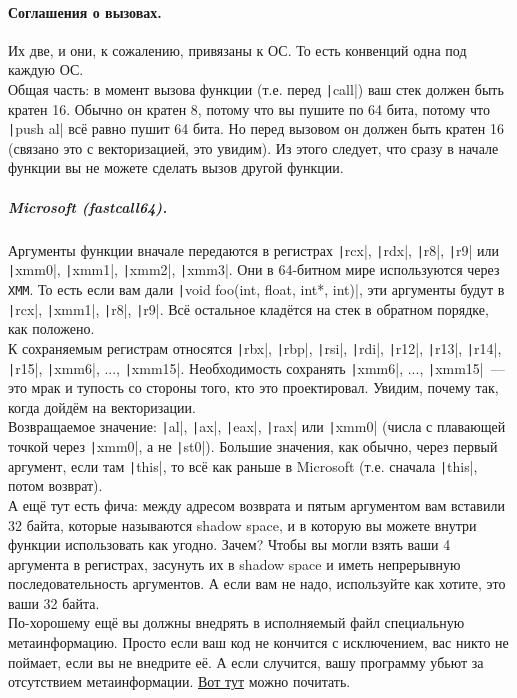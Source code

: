 \documentclass{article}
\begin{document}
    \paragraph{Соглашения о вызовах.}
    Их две, и они, к сожалению, привязаны к ОС. То есть конвенций одна под каждую ОС.\\
    Общая часть: в момент вызова функции (т.е. перед \texttt|call|) ваш стек должен быть кратен 16. Обычно он кратен 8, потому что вы пушите по 64 бита, потому что \texttt|push al| всё равно пушит 64 бита. Но перед вызовом он должен быть кратен 16 (связано это с векторизацией, это увидим). Из этого следует, что сразу в начале функции вы не можете сделать вызов другой функции.
    \subparagraph{Microsoft (fastcall64).}
    Аргументы функции вначале передаются в регистрах \texttt|rcx|, \texttt|rdx|, \texttt|r8|, \texttt|r9| или \texttt|xmm0|, \texttt|xmm1|, \texttt|xmm2|, \texttt|xmm3|. Они в 64-битном мире используются через \Verb|XMM|. То есть если вам дали \texttt|void foo(int, float, int*, int)|, эти аргументы будут в \texttt|rcx|, \texttt|xmm1|, \texttt|r8|, \texttt|r9|. Всё остальное кладётся на стек в обратном порядке, как положено.\\
    К сохраняемым регистрам относятся \texttt|rbx|, \texttt|rbp|, \texttt|rsi|, \texttt|rdi|, \texttt|r12|, \texttt|r13|, \texttt|r14|, \texttt|r15|, \texttt|xmm6|, ..., \texttt|xmm15|. Необходимость сохранять \texttt|xmm6|, ..., \texttt|xmm15|~--- это мрак и тупость со стороны того, кто это проектировал. Увидим, почему так, когда дойдём на векторизации.\\
    Возвращаемое значение: \texttt|al|, \texttt|ax|, \texttt|eax|, \texttt|rax| или \texttt|xmm0| (числа с плавающей точкой через \texttt|xmm0|, а не \texttt|st0|). Большие значения, как обычно, через первый аргумент, если там \texttt|this|, то всё как раньше в Microsoft (т.е. сначала \texttt|this|, потом возврат).\\
    А ещё тут есть фича: между адресом возврата и пятым аргументом вам вставили 32 байта, которые называются shadow space, и в которую вы можете внутри функции использовать как угодно. Зачем? Чтобы вы могли взять ваши 4 аргумента в регистрах, засунуть их в shadow space и иметь непрерывную последовательность аргументов. А если вам не надо, используйте как хотите, это ваши 32 байта.\\
    По-хорошему ещё вы должны внедрять в исполняемый файл специальную метаинформацию. Просто если ваш код не кончится с исключением, вас никто не поймает, если вы не внедрите её. А если случится, вашу программу убьют за отсутствием метаинформации. \href{https://learn.microsoft.com/en-us/cpp/build/x64-calling-convention?view=msvc-170#unwindability}{Вот тут} можно почитать.
\end{document}
